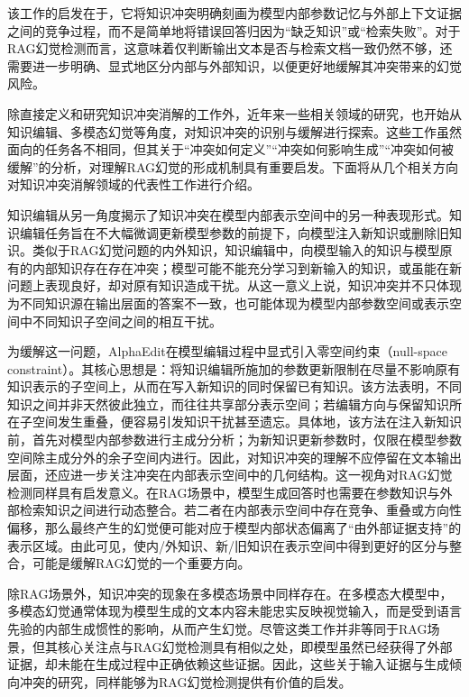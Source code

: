 该工作的启发在于，它将知识冲突明确刻画为模型内部参数记忆与外部上下文证据之间的竞争过程，而不是简单地将错误回答归因为“缺乏知识”或“检索失败”。对于RAG幻觉检测而言，这意味着仅判断输出文本是否与检索文档一致仍然不够，还需要进一步明确、显式地区分内部与外部知识，以便更好地缓解其冲突带来的幻觉风险。

除直接定义和研究知识冲突消解的工作外，近年来一些相关领域的研究，也开始从知识编辑、多模态幻觉等角度，对知识冲突的识别与缓解进行探索。这些工作虽然面向的任务各不相同，但其关于“冲突如何定义”“冲突如何影响生成”“冲突如何被缓解”的分析，对理解RAG幻觉的形成机制具有重要启发。下面将从几个相关方向对知识冲突消解领域的代表性工作进行介绍。

知识编辑从另一角度揭示了知识冲突在模型内部表示空间中的另一种表现形式。知识编辑任务旨在不大幅微调更新模型参数的前提下，向模型注入新知识或删除旧知识\cite{meng2023mass,fang2025alphaedit}。类似于RAG幻觉问题的内外知识，知识编辑中，向模型输入的知识与模型原有的内部知识存在存在冲突；模型可能不能充分学习到新输入的知识，或虽能在新问题上表现良好，却对原有知识造成干扰。从这一意义上说，知识冲突并不只体现为不同知识源在输出层面的答案不一致，也可能体现为模型内部参数空间或表示空间中不同知识子空间之间的相互干扰。

为缓解这一问题，AlphaEdit\cite{fang2025alphaedit}在模型编辑过程中显式引入零空间约束（null-space constraint）。其核心思想是：将知识编辑所施加的参数更新限制在尽量不影响原有知识表示的子空间上，从而在写入新知识的同时保留已有知识。该方法表明，不同知识之间并非天然彼此独立，而往往共享部分表示空间；若编辑方向与保留知识所在子空间发生重叠，便容易引发知识干扰甚至遗忘。具体地，该方法在注入新知识前，首先对模型内部参数进行主成分分析；为新知识更新参数时，仅限在模型参数空间除主成分外的余子空间内进行。因此，对知识冲突的理解不应停留在文本输出层面，还应进一步关注冲突在内部表示空间中的几何结构。这一视角对RAG幻觉检测同样具有启发意义。在RAG场景中，模型生成回答时也需要在参数知识与外部检索知识之间进行动态整合。若二者在内部表示空间中存在竞争、重叠或方向性偏移，那么最终产生的幻觉便可能对应于模型内部状态偏离了“由外部证据支持”的表示区域。由此可见，使内/外知识、新/旧知识在表示空间中得到更好的区分与整合，可能是缓解RAG幻觉的一个重要方向。

除RAG场景外，知识冲突的现象在多模态场景中同样存在。在多模态大模型中，多模态幻觉通常体现为模型生成的文本内容未能忠实反映视觉输入，而是受到语言先验的内部生成惯性的影响，从而产生幻觉\cite{bai2025hallucination,li2025self,liu2025reducing,yang2025understanding,wang2025mllm}。尽管这类工作并非等同于RAG场景，但其核心关注点与RAG幻觉检测具有相似之处，即模型虽然已经获得了外部证据，却未能在生成过程中正确依赖这些证据。因此，这些关于输入证据与生成倾向冲突的研究，同样能够为RAG幻觉检测提供有价值的启发。

